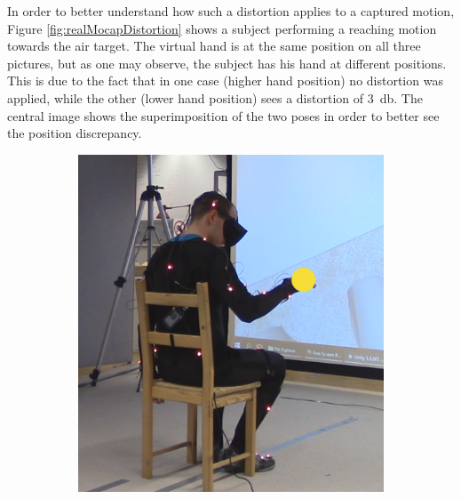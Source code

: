 In order to better understand how such a distortion applies to a captured motion, Figure \ref{fig:realMocapDistortion} shows a subject performing a reaching motion towards the air target. The virtual hand is at the same position on all three pictures, but as one may observe, the subject has his hand at different positions. This is due to the fact that in one case (higher hand position) no distortion was applied, while the other (lower hand position) sees a distortion of \SI{3}{\decibel}. The central image shows the superimposition of the two poses in order to better see the position discrepancy.

\begin{figure}[h]
    \centering
    \begin{subfigure}[b]{.3\textwidth}
        \includegraphics[width=\textwidth]{Figures/handPositionTargetNoDist.png}
    \end{subfigure}
    ~
    \begin{subfigure}[b]{.3\textwidth}

\end{subfigure}
\end{figure}
